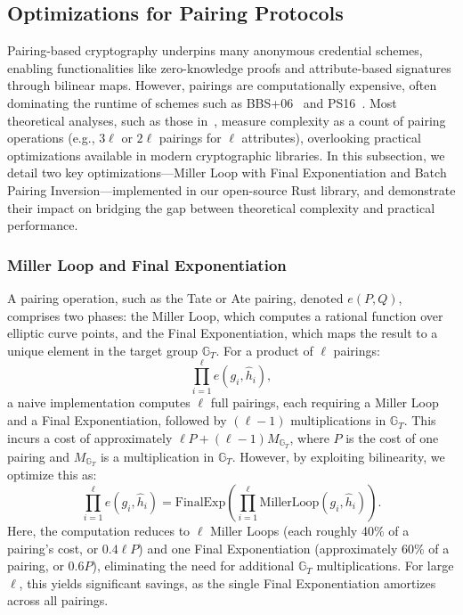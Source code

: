 \subsection{Optimizations for Pairing Protocols }

Pairing-based cryptography underpins many anonymous credential schemes, enabling functionalities like zero-knowledge proofs and attribute-based signatures through bilinear maps. However, pairings are computationally expensive, often dominating the runtime of schemes such as BBS+06~\cite{hutchison_constant-size_2006} and PS16~\cite{sako_short_2016}. Most theoretical analyses, such as those in~\cite{sako_short_2016}, measure complexity as a count of pairing operations (e.g., $3\ell$ or $2\ell$ pairings for $\ell$ attributes), overlooking practical optimizations available in modern cryptographic libraries. In this subsection, we detail two key optimizations—Miller Loop with Final Exponentiation and Batch Pairing Inversion—implemented in our open-source Rust library, and demonstrate their impact on bridging the gap between theoretical complexity and practical performance.

\subsubsection*{Miller Loop and Final Exponentiation}
A pairing operation, such as the Tate or Ate pairing, denoted $e(P, Q)$, comprises two phases: the Miller Loop, which computes a rational function over elliptic curve points, and the Final Exponentiation, which maps the result to a unique element in the target group $\mathbb{G}_T$. For a product of $\ell$ pairings:
\[
\prod_{i=1}^\ell e(g_i, \hat{h}_i),
\]
a naive implementation computes $\ell$ full pairings, each requiring a Miller Loop and a Final Exponentiation, followed by $(\ell-1)$ multiplications in $\mathbb{G}_T$. This incurs a cost of approximately $\ell P + (\ell-1)M_{\mathbb{G}_T}$, where $P$ is the cost of one pairing and $M_{\mathbb{G}_T}$ is a multiplication in $\mathbb{G}_T$. However, by exploiting bilinearity, we optimize this as:
\[
\prod_{i=1}^\ell e(g_i, \hat{h}_i) = \text{FinalExp}\left( \prod_{i=1}^\ell \text{MillerLoop}(g_i, \hat{h}_i) \right).
\]
Here, the computation reduces to $\ell$ Miller Loops (each roughly 40\% of a pairing’s cost, or $0.4\ell P$) and one Final Exponentiation (approximately 60\% of a pairing, or $0.6P$), eliminating the need for additional $\mathbb{G}_T$ multiplications. For large $\ell$, this yields significant savings, as the single Final Exponentiation amortizes across all pairings.


